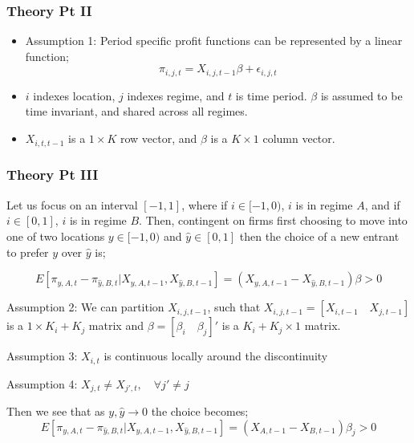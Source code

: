 \documentclass{beamer}
\begin{document}
\begin{frame}
\frametitle{Theory Pt II}
\begin{itemize}
\item Assumption 1: Period specific profit functions can be represented by a linear function;
\begin{equation} \label{profit}
\pi_{i,j,t} =  X_{i,j,t-1}\beta+\epsilon_{i,j,t}
\end{equation}
\item $i$ indexes location, $j$ indexes regime, and $t$ is time period. $\beta$ is assumed to be time invariant, and shared across all regimes.
\item $X_{i,t,t-1}$ is a $1 \times K$ row vector, and $\beta$ is a $K \times 1$ column vector.
\end{itemize}
\end{frame}

\begin{frame}
\frametitle{Theory Pt III}
Let us focus on an interval $[-1,1]$, where if $i \in [-1,0)$, $i$ is in regime $A$, and if $i \in [0,1]$, $i$ is in regime $B$. Then, contingent on firms first choosing to move into one of two locations $y \in [-1,0)$ and $\hat y \in [0,1]$ then the choice of a new entrant to prefer $y$ over $\hat y$ is;

$$ E[\pi_{y,A,t}-\pi_{\hat y,B,t}|X_{y,A,t-1},X_{\hat y,B,t-1}] = (X_{y,A,t-1}-X_{\hat y,B,t-1})\beta > 0 $$

Assumption 2: We can partition $X_{i,j,t-1}$, such that $X_{i,j,t-1}= [X_{i,t-1} \quad X_{j,t-1}]$ is a $1 \times K_{i} + K_{j}$ matrix and $\beta = [\beta_{i} \quad \beta_{j}]'$ is a $K_{i} + K_{j} \times 1$ matrix.

Assumption 3: $X_{i,t}$ is continuous locally around the discontinuity

Assumption 4: $X_{j,t} \neq X_{j',t}, \quad \forall j' \neq j$

Then we see that as $y,\hat y \to 0$ the choice becomes;
$$ E[\pi_{y,A,t}-\pi_{\hat y,B,t}|X_{y,A,t-1},X_{\hat y,B,t-1}] = (X_{A,t-1}-X_{B,t-1})\beta_{j} > 0$$
\end{frame}
\end{document}
